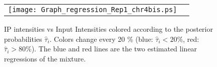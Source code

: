 \documentclass{llncs}
\begin{document}
\begin{figure}
  \begin{center}
    \begin{tabular}{cc}
       \texttt{[image: Graph\_regression\_Rep1\_chr4bis.ps]}%
    \end{tabular}
  \end{center}
\caption{IP intensities vs Input Intensities colored according to
the posterior probabilities $\hat{\tau}_i$. Colors change every 20
\% (blue: $\hat{\tau}_i<20\%$, red: $\hat{\tau}_i>80\%$). The blue
and red lines are the two estimated linear regressions of the
mixture. \label{Figure:Resultats}}
\end{figure}


\end{document}
